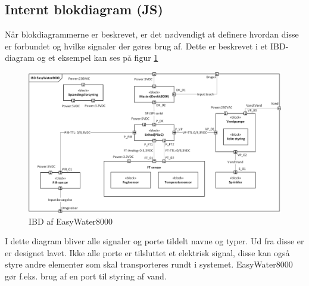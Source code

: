 \subsection{Internt blokdiagram (JS)}
Når blokdiagrammerne er beskrevet, er det nødvendigt at definere hvordan disse er forbundet og hvilke signaler der gøres brug af. Dette er beskrevet i et IBD-diagram og et eksempel kan ses på figur \ref{lab:IBD}

\begin{figure}[H]
  \centering
    \includegraphics[width=\textwidth]{Billeder/IBD}
    \caption{IBD af EasyWater8000}
    \label{lab:IBD}
\end{figure}

I dette diagram bliver alle signaler og porte tildelt navne og typer. Ud fra disse er er designet lavet. Ikke alle porte er tilsluttet et elektrisk signal, disse kan også styre andre elementer som skal transporteres rundt i systemet. EasyWater8000 gør f.eks. brug af en port til styring af vand.